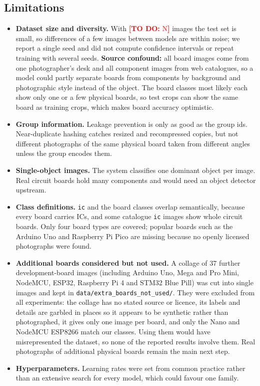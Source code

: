 \documentclass[11pt,a4paper]{article}
\newcommand{\fillin}[1]{\textcolor{red}{\textbf{[TO DO:} #1\textbf{]}}}
\providecommand{\NumImages}{\fillin{N}}
\begin{document}
\subsection{Limitations}\label{sec:limitations}
\begin{itemize}
  \item \textbf{Dataset size and diversity.} With \NumImages{} images the test set is small, so differences of a few images between models are within noise; we report a single seed and did not compute confidence intervals or repeat training with several seeds. \textbf{Source confound:} all board images come from one photographer's desk and all component images from web catalogues, so a model could partly separate boards from components by background and photographic style instead of the object. The board classes most likely each show only one or a few physical boards, so test crops can show the same board as training crops, which makes board accuracy optimistic.
  \item \textbf{Group information.} Leakage prevention is only as good as the group ids. Near-duplicate hashing catches resized and recompressed copies, but not different photographs of the same physical board taken from different angles unless the group encodes them.
  \item \textbf{Single-object images.} The system classifies one dominant object per image. Real circuit boards hold many components and would need an object detector upstream.
  \item \textbf{Class definitions.} \texttt{ic} and the board classes overlap semantically, because every board carries ICs, and some catalogue \texttt{ic} images show whole circuit boards. Only four board types are covered; popular boards such as the Arduino Uno and Raspberry Pi Pico are missing because no openly licensed photographs were found.
  \item \textbf{Additional boards considered but not used.} A collage of 37 further development-board images (including Arduino Uno, Mega and Pro Mini, NodeMCU, ESP32, Raspberry Pi 4 and STM32 Blue Pill) was cut into single images and kept in \texttt{data/extra\_boards\_not\_used/}. They were excluded from all experiments: the collage has no stated source or licence, its labels and details are garbled in places so it appears to be synthetic rather than photographed, it gives only one image per board, and only the Nano and NodeMCU ESP8266 match our classes. Using them would have misrepresented the dataset, so none of the reported results involve them. Real photographs of additional physical boards remain the main next step.
  \item \textbf{Hyperparameters.} Learning rates were set from common practice rather than an extensive search for every model, which could favour one family.
\end{itemize}
\end{document}
